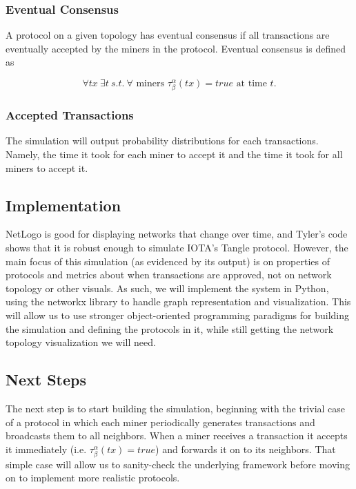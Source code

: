 \documentclass[letterpaper,11pt]{article}
\begin{document}
\subsubsection{Eventual Consensus}
A protocol on a given topology has eventual consensus if all transactions are eventually accepted by the miners in the protocol. Eventual consensus is defined as

\[\forall tx~\exists t~s.t.~\forall \textrm{ miners } \tau_\beta^\alpha(tx) = true \textrm{ at time } t.\]

\subsubsection{Accepted Transactions}
The simulation will output probability distributions for each transactions. Namely, the time it took for each miner to accept it and the time it took for all miners to accept it.

\subsection{Implementation}
NetLogo is good for displaying networks that change over time, and Tyler's code shows that it is robust enough to simulate IOTA's Tangle protocol. However, the main focus of this simulation (as evidenced by its output) is on properties of protocols and metrics about when transactions are approved, not on network topology or other visuals. As such, we will implement the system in Python, using the networkx library to handle graph representation and visualization. This will allow us to use stronger object-oriented programming paradigms for building the simulation and defining the protocols in it, while still getting the network topology visualization we will need.

\subsection{Next Steps}
The next step is to start building the simulation, beginning with the trivial case of a protocol in which each miner periodically generates transactions and broadcasts them to all neighbors. When a miner receives a transaction it accepts it immediately (i.e. $\tau_\beta^\alpha(tx) = true$) and forwards it on to its neighbors. That simple case will allow us to sanity-check the underlying framework before moving on to implement more realistic protocols.
\end{document}
